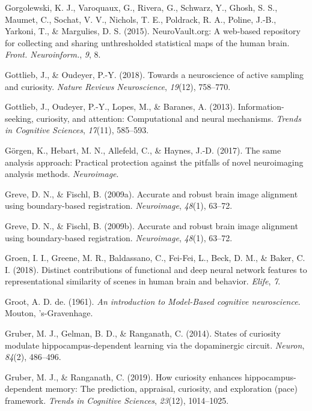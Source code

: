 \documentclass[11pt,american,a4paper,oneside,]{memoir} %
\begin{document}
\leavevmode\hypertarget{ref-Gorgolewski2015-hj}{}%
Gorgolewski, K. J., Varoquaux, G., Rivera, G., Schwarz, Y., Ghosh, S. S., Maumet, C., Sochat, V. V., Nichols, T. E., Poldrack, R. A., Poline, J.-B., Yarkoni, T., \& Margulies, D. S. (2015). NeuroVault.org: A web-based repository for collecting and sharing unthresholded statistical maps of the human brain. \emph{Front. Neuroinform.}, \emph{9}, 8.

\leavevmode\hypertarget{ref-gottlieb2018towards}{}%
Gottlieb, J., \& Oudeyer, P.-Y. (2018). Towards a neuroscience of active sampling and curiosity. \emph{Nature Reviews Neuroscience}, \emph{19}(12), 758--770.

\leavevmode\hypertarget{ref-gottlieb2013information}{}%
Gottlieb, J., Oudeyer, P.-Y., Lopes, M., \& Baranes, A. (2013). Information-seeking, curiosity, and attention: Computational and neural mechanisms. \emph{Trends in Cognitive Sciences}, \emph{17}(11), 585--593.

\leavevmode\hypertarget{ref-Gorgen2017-sy}{}%
Görgen, K., Hebart, M. N., Allefeld, C., \& Haynes, J.-D. (2017). The same analysis approach: Practical protection against the pitfalls of novel neuroimaging analysis methods. \emph{Neuroimage}.

\leavevmode\hypertarget{ref-greve2009accurate}{}%
Greve, D. N., \& Fischl, B. (2009a). Accurate and robust brain image alignment using boundary-based registration. \emph{Neuroimage}, \emph{48}(1), 63--72.

\leavevmode\hypertarget{ref-Greve2009-da}{}%
Greve, D. N., \& Fischl, B. (2009b). Accurate and robust brain image alignment using boundary-based registration. \emph{Neuroimage}, \emph{48}(1), 63--72.

\leavevmode\hypertarget{ref-Groen2018-qo}{}%
Groen, I. I., Greene, M. R., Baldassano, C., Fei-Fei, L., Beck, D. M., \& Baker, C. I. (2018). Distinct contributions of functional and deep neural network features to representational similarity of scenes in human brain and behavior. \emph{Elife}, \emph{7}.

\leavevmode\hypertarget{ref-degroot}{}%
Groot, A. D. de. (1961). \emph{An introduction to Model-Based cognitive neuroscience}. Mouton, 's-Gravenhage.

\leavevmode\hypertarget{ref-gruber2014states}{}%
Gruber, M. J., Gelman, B. D., \& Ranganath, C. (2014). States of curiosity modulate hippocampus-dependent learning via the dopaminergic circuit. \emph{Neuron}, \emph{84}(2), 486--496.

\leavevmode\hypertarget{ref-gruber2019curiosity}{}%
Gruber, M. J., \& Ranganath, C. (2019). How curiosity enhances hippocampus-dependent memory: The prediction, appraisal, curiosity, and exploration (pace) framework. \emph{Trends in Cognitive Sciences}, \emph{23}(12), 1014--1025.
\end{document}
